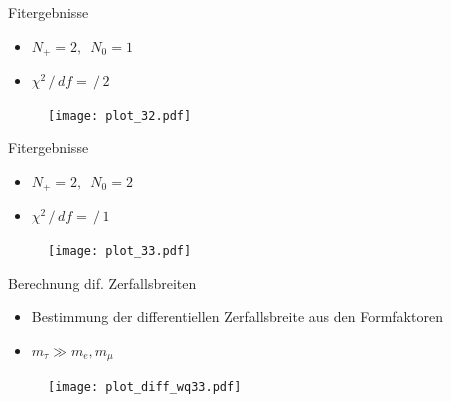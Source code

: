 \documentclass[fleqn, aspectratio=1610, professionalfonts, 9pt]{beamer}
\begin{document}
\begin{frame}{Fitergebnisse}
  \begin{minipage}{4.5cm}
    \begin{itemize}
      \setlength\itemsep{2em}
      \item $N_+ = \num{2}, \enspace N_0 = \num{1}$
      \item $\chi^2 \,/\, df=  \,/\, \num{2}$
    \end{itemize}
  \end{minipage}
  \begin{minipage}{10cm}
    \begin{figure}
      \centering
      \texttt{[image: plot\_32.pdf]}
    \end{figure}
  \end{minipage}%
\end{frame}

\begin{frame}{Fitergebnisse}
  \begin{minipage}{4.5cm}
    \begin{itemize}
      \setlength\itemsep{2em}
      \item $N_+ = \num{2}, \enspace N_0 = \num{2}$
      \item $\chi^2 \,/\, df=  \,/\, \num{1}$
    \end{itemize}
  \end{minipage}
  \begin{minipage}{10cm}
    \begin{figure}
      \centering
      \texttt{[image: plot\_33.pdf]}
    \end{figure}
  \end{minipage}%
\end{frame}

\begin{frame}{Berechnung dif. Zerfallsbreiten}
  \begin{minipage}{5cm}
    \begin{itemize}
      \setlength\itemsep{2em}
      \item<1-> Bestimmung der differentiellen Zerfallsbreite aus den Formfaktoren
      \item<2-> $m_{\tau} \gg m_e, m_{\mu}$
    \end{itemize}
  \end{minipage}
  \begin{minipage}{9cm}
    \begin{figure}
      \centering
      \texttt{[image: plot\_diff\_wq33.pdf]}
    \end{figure}
  \end{minipage}%
\end{frame}
\end{document}
